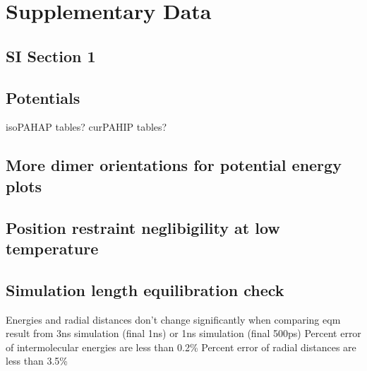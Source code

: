 \section{Supplementary Data}
\label{supplinfo}
%
\subsection{SI Section 1}

\subsection{Potentials}
isoPAHAP tables?
curPAHIP tables?

\subsection{More dimer orientations for potential energy plots}

\subsection{Position restraint neglibigility at low temperature}

\subsection{Simulation length equilibration check}
Energies and radial distances don’t change significantly when comparing eqm result from 3ns simulation (final 1ns) or 1ns simulation (final 500ps)
Percent error of intermolecular energies are less than 0.2\%
Percent error of radial distances are less than 3.5\%



\newpage